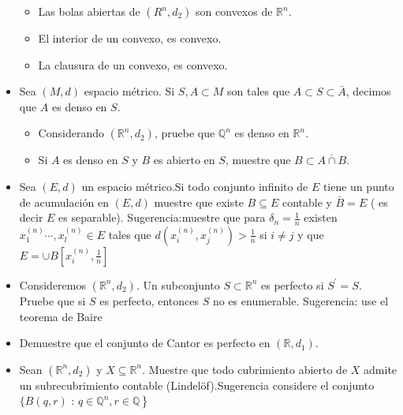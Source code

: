 \begin{itemize}[leftmargin=*]
        \begin{itemize}
            \item Las bolas abiertas de $\left(R^n, d_2\right)$ son convexos de $\mathbb{R}^n$.
            
            \item El interior de un convexo, es convexo.
            
            \item La clausura de un convexo, es convexo.
            \end{itemize}

        \item Sea $(M, d)$ espacio métrico. Si $S, A \subset M$ son tales que $A \subset S \subset \bar{A}$, decimos que $A$ es denso en $S$.
        
        \begin{itemize}
        
        \item Considerando $\left(\mathbb{R}^n, d_2\right)$, pruebe que $\mathbb{Q}^n$ es denso en $\mathbb{R}^n$.
        
        \item Si $A$ es denso en $S$ y $B$ es abierto en $S$, muestre que $B \subset \overline{A \cap B}$.
        
    \end{itemize}
    
    \item Sea $(E, d)$ un espacio métrico.Si todo conjunto infinito de $E$ tiene un punto de acumulación en $(E, d)$ muestre que existe $B \subseteq E$ contable y $\bar{B}=E$ ( es decir $E$ es separable). Sugerencia:muestre que para $\delta_n=\frac{1}{n}$ existen $x_1^{(n)} \cdots, x_l^{(n)} \in E$ tales que $d\left(x_i^{(n)}, x_j^{(n)}\right)>\frac{1}{n}$ si $i \neq j$ y que $E=\cup B\left[x_i^{(n)}, \frac{1}{n}\right]$

    \item Consideremos $\left(\mathbb{R}^n, d_2\right)$. Un subconjunto $S \subset \mathbb{R}^n$ es perfecto si $S^{\prime}=S$. Pruebe que si $S$ es perfecto, entonces $S$ no es enumerable. Sugerencia: use el teorema de Baire

    \item Demuestre que el conjunto de Cantor es perfecto en $\left(\mathbb{R}, d_1\right)$.
    
    \item Sean $\left(\mathbb{R}^n, d_2\right)$ y $X \subseteq \mathbb{R}^n$. Muestre que todo cubrimiento abierto de $X$ admite un subrecubrimiento contable (Lindelöf).Sugerencia considere el conjunto $\{B(q, r)$ : $\left.q \in \mathbb{Q}^n, r \in \mathbb{Q}\right\}$
    

\end{itemize}
